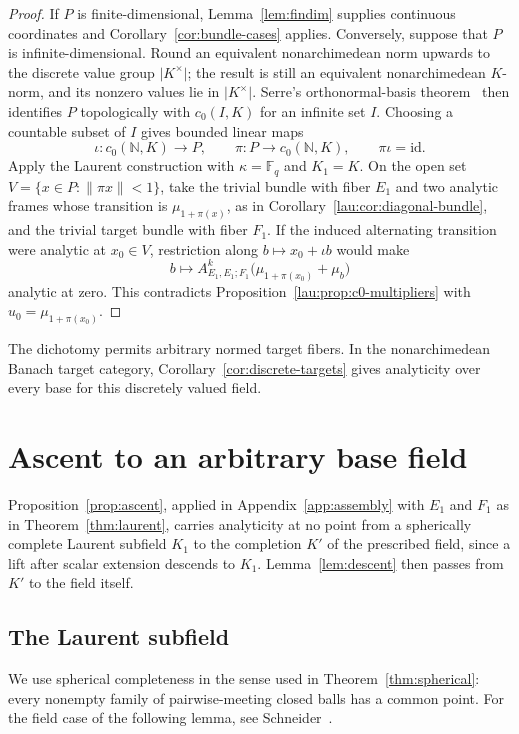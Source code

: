 \documentclass[11pt]{amsart}
\theoremstyle{definition}
\theoremstyle{remark}
\numberwithin{equation}{section}
\newcommand{\N}{\mathbb N}
\newcommand{\F}{\mathbb F}
\newcommand{\id}{\mathrm{id}}
\newcommand{\abs}[1]{\lvert #1\rvert}
\newcommand{\norm}[1]{\lVert #1\rVert}
\theoremstyle{plain}
\theoremstyle{definition}
\theoremstyle{plain}
\begin{document}
\begin{proof}
If $P$ is finite-dimensional, Lemma~\ref{lem:findim} supplies continuous coordinates and Corollary~\ref{cor:bundle-cases} applies. Conversely, suppose that $P$ is infinite-dimensional. Round an equivalent nonarchimedean norm upwards to the discrete value group $\abs{K^\times}$; the result is still an equivalent nonarchimedean $K$\nobreakdash-norm, and its nonzero values lie in $\abs{K^\times}$. Serre's orthonormal-basis theorem~\cite[\S1, Proposition~1]{Se} then identifies $P$ topologically with $c_0(I,K)$ for an infinite set $I$. Choosing a countable subset of $I$ gives bounded linear maps
\[
 \iota\colon c_0(\N,K)\longrightarrow P,\qquad
 \pi\colon P\longrightarrow c_0(\N,K),\qquad \pi\iota=\id.
\]
Apply the Laurent construction with $\kappa=\F_q$ and $K_1=K$. On the open set $V=\{x\in P:\norm{\pi x}<1\}$, take the trivial bundle with fiber $E_1$ and two analytic frames whose transition is $\mu_{1+\pi(x)}$, as in Corollary~\ref{lau:cor:diagonal-bundle}, and the trivial target bundle with fiber $F_1$. If the induced alternating transition were analytic at $x_0\in V$, restriction along $b\mapsto x_0+\iota b$ would make
\[
 b\longmapsto A^k_{E_1,E_1;F_1}\bigl(\mu_{1+\pi(x_0)}+\mu_b\bigr)
\]
analytic at zero. This contradicts Proposition~\ref{lau:prop:c0-multipliers} with $u_0=\mu_{1+\pi(x_0)}$.
\end{proof}

The dichotomy permits arbitrary normed target fibers. In the nonarchimedean Banach target category, Corollary~\ref{cor:discrete-targets} gives analyticity over every base for this discretely valued field.
\section{Ascent to an arbitrary base field}\label{app:ascent}\label{sec:ascent}

Proposition~\ref{prop:ascent}, applied in Appendix~\ref{app:assembly} with $E_1$ and $F_1$ as in Theorem~\ref{thm:laurent},
carries analyticity at no point from a spherically complete Laurent subfield $K_1$ to the completion $K'$ of the prescribed
field, since a lift after scalar extension descends to $K_1$. Lemma~\ref{lem:descent} then passes from $K'$ to the field itself.

\subsection{The Laurent subfield}
We use spherical completeness in the sense used in Theorem~\ref{thm:spherical}: every nonempty family of pairwise-meeting
closed balls has a common point. For the field case of the following lemma, see
Schneider~\cite[Lemmas~1.3 and~1.6]{Sch}.
\end{document}
